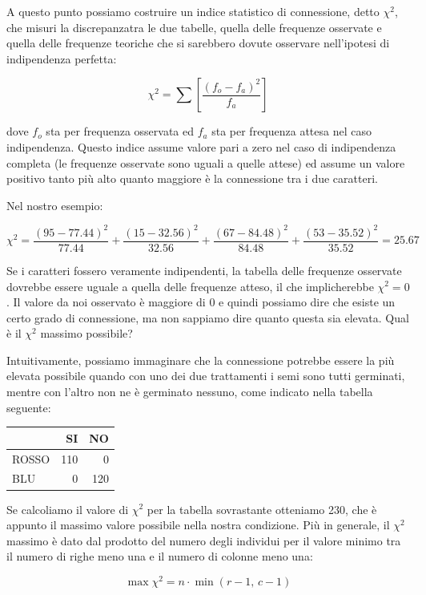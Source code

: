 \documentclass[a4paper,12pt,oneside]{book}
\begin{document}
A questo punto possiamo costruire un indice statistico di connessione, detto \(\chi^2\), che misuri la discrepanzatra le due tabelle, quella delle frequenze osservate e quella delle frequenze teoriche che si sarebbero dovute osservare nell'ipotesi di indipendenza perfetta:

\[\chi ^2  = \sum \left[ \frac{\left( {f_o  - f_a } \right)^2 }{f_a } \right]\]

dove \(f_o\) sta per frequenza osservata ed \(f_a\) sta per frequenza attesa nel caso indipendenza. Questo indice assume valore pari a zero nel caso di indipendenza completa (le frequenze osservate sono uguali a quelle attese) ed assume un valore positivo tanto più alto quanto maggiore è la connessione tra i due caratteri.

Nel nostro esempio:

\[\chi^2  = \frac{\left( {95  - 77.44 } \right)^2 }{77.44 } + \frac{\left( {15  - 32.56 } \right)^2 }{32.56 } + \frac{\left( {67  - 84.48 } \right)^2 }{84.48 } + \frac{\left( {53  - 35.52 } \right)^2 }{35.52 } = 25.67\]

Se i caratteri fossero veramente indipendenti, la tabella delle frequenze osservate dovrebbe essere uguale a quella delle frequenze atteso, il che implicherebbe \(\chi^2 = 0\). Il valore da noi osservato è maggiore di 0 e quindi possiamo dire che esiste un certo grado di connessione, ma non sappiamo dire quanto questa sia elevata. Qual è il \(\chi^2\) massimo possibile?

Intuitivamente, possiamo immaginare che la connessione potrebbe essere la più elevata possibile quando con uno dei due trattamenti i semi sono tutti germinati, mentre con l'altro non ne è germinato nessuno, come indicato nella tabella seguente:

\begin{tabular}{l|r|r}
\hline
  & SI & NO\\
\hline
ROSSO & 110 & 0\\
\hline
BLU & 0 & 120\\
\hline
\end{tabular}

Se calcoliamo il valore di \(\chi^2\) per la tabella sovrastante otteniamo 230, che è appunto il massimo valore possibile nella nostra condizione. Più in generale, il \(\chi^2\) massimo è dato dal prodotto del numero degli individui per il valore minimo tra il numero di righe meno una e il numero di colonne meno una:

\[\max \chi ^2  = n \cdot \min (r - 1,\,c - 1)\]
\end{document}
